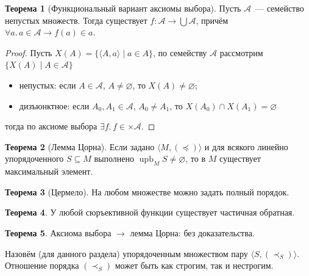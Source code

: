 \documentclass[a4paper,11pt]{article}
\theoremstyle{definition}
\newtheorem*{thm}{Теорема}
\newcommand{\upb}{\operatorname{upb}}
\begin{document}
\begin{thm}[Функциональный вариант аксиомы выбора]
Пусть $\mathcal{A}$~--- семейство непустых множеств. Тогда существует $f :
\mathcal{A} \to \bigcup\mathcal{A}$, причём $\forall a.\,a \in \mathcal{A} \to
f(a) \in a$.
\end{thm}
\begin{proof}
Пусть $X(A) = \{\langle A, a\rangle \mid a \in A\}$, по семейству $\mathcal{A}$
рассмотрим $\{X(A) \mid A \in \mathcal{A}\}$
\begin{itemize}
\item непустых: если $A \in \mathcal{A}$, $A \ne \varnothing$, то $X(A) \ne
  \varnothing$;
\item дизъюнктное: если $A_0, A_1 \in \mathcal{A}$, $A_0 \ne A_1$, то $X(A_0)
  \cap X(A_1) = \varnothing$
\end{itemize}
тогда по аксиоме выбора $\exists f.\,f \in \times\mathcal{A}$.
\end{proof}

\begin{thm}[Лемма Цорна]
Если задано $\langle M, (\preceq)\rangle$ и для всякого линейно упорядоченного
$S \subseteq M$ выполнено $\upb_M S \ne \varnothing$, то в $M$ существует
максимальный элемент.
\end{thm}
\begin{thm}[Цермело]
На любом множестве можно задать полный порядок.
\end{thm}
\begin{thm}
У любой сюръективной функции существует частичная обратная.
\end{thm}
\begin{thm}
Аксиома выбора $\to$ лемма Цорна: без доказательства.
\end{thm}

Назовём (для данного раздела) упорядоченным множеством пару $\langle S,
(\prec_S)\rangle$. Отношение порядка $(\prec_S)$ может быть как строгим, так и
нестрогим.
\end{document}
